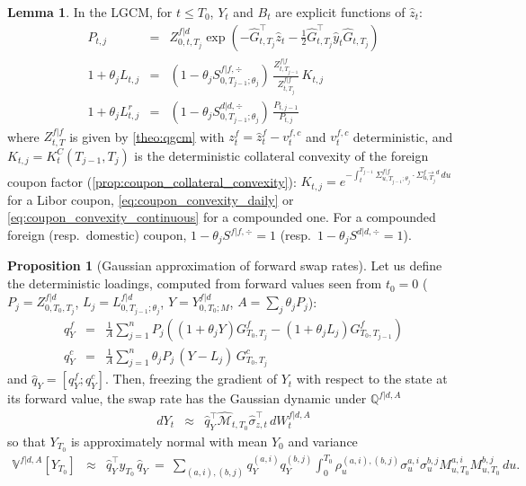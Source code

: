 \documentclass[11pt,english]{amsart}
\newcommand{\QQ}{\mathbb{Q}}
\newcommand{\VV}{\mathbb{V}}
\theoremstyle{definition}
\newtheorem{prop}{Proposition}
\newtheorem{lemm}{Lemma}
\begin{document}
\begin{lemm}\label{lemm:par_spread_state_functions}
In the LGCM, for $t\le T_0$, $Y_t$ and $B_t$ are explicit functions of $\hat{z}_t$:
\begin{eqnarray*}
  P_{t,j} &=& Z^{f|d}_{0,t,T_j} \exp\left( -\hat{G}^{\top}_{t,T_j} \hat{z}_t - \frac{1}{2} \hat{G}^{\top}_{t,T_j}  \hat{y}_t \hat{G}_{t,T_j} \right) \\
  1+\theta_j L_{t,j} &=& (1-\theta_j S^{f|f,\div}_{0,T_{j-1};\theta_j}) \, \frac{Z^{f|f}_{t,T_{j-1}}}{Z^{f|f}_{t,T_j}} \, K_{t,j}  \\
  1+\theta_j L^{r}_{t,j} &=& (1-\theta_j S^{d|d,\div}_{0,T_{j-1};\theta_j}) \, \frac{P_{t,j-1}}{P_{t,j}}
\end{eqnarray*}
where $Z^{f|f}_{t,T}$ is given by \autoref{theo:qgcm} with $z^f_t = \hat{z}^f_t - v^{f,c}_t$ and $v^{f,c}_t$ deterministic, and $K_{t,j} = K^C_t(T_{j-1},T_j)$ is the deterministic collateral convexity of the foreign coupon factor (\autoref{prop:coupon_collateral_convexity}): $K_{t,j} = e^{- \int_t^{T_{j-1}} \Sigma^{f|f}_{u,T_{j-1};\theta_j}\cdot\Sigma^{f\to d}_{u,T_j}\, du}$ for a Libor coupon, \eqref{eq:coupon_convexity_daily} or \eqref{eq:coupon_convexity_continuous} for a compounded one. For a compounded foreign (resp.\ domestic) coupon, $1-\theta_jS^{f|f,\div} = 1$ (resp.\ $1-\theta_jS^{d|d,\div} = 1$).
\end{lemm}

\begin{prop}[Gaussian approximation of forward swap rates]\label{prop:gauss_swap_rate}
Let us define the deterministic loadings, computed from forward values seen from $t_0 = 0$ ($P_j = Z^{f|d}_{0,T_0,T_j}$, $L_j = L^{f|d}_{0,T_{j-1};\theta_j}$, $Y = Y^{f|d}_{0,T_0;M}$, $A = \sum_j\theta_jP_j$):
\begin{eqnarray}
  q^{f}_Y &=& \frac{1}{A} \sum_{j=1}^n P_j\left( (1+\theta_j Y) G^f_{T_0,T_j} - (1+\theta_j L_j) G^f_{T_0,T_{j-1}} \right) \\
  q^{c}_Y &=& \frac{1}{A} \sum_{j=1}^n \theta_j P_j\, (Y - L_j)\, G^c_{T_0,T_j}
\end{eqnarray}
and $\hat{q}_Y = [q^f_Y ; q^c_Y]$. Then, freezing the gradient of $Y_t$ with respect to the state at its forward value, the swap rate has the Gaussian dynamic under $\QQ^{f|d,A}$
\begin{eqnarray}
  dY_t &\approx& \hat{q}_Y^\top \hat{\mathcal{M}}_{t,T_0} \hat{\sigma}^\top_{z,t} \, dW^{f|d,A}_t
\end{eqnarray}
so that $Y_{T_0}$ is approximately normal with mean $Y_0$ and variance
\begin{eqnarray}
  \VV^{f|d,A}\left[Y_{T_0}\right] &\approx& \hat{q}_Y^\top \hat{y}_{T_0}\, \hat{q}_Y
  ~=~ \sum_{(a,i),(b,j)} q^{(a,i)}_Y q^{(b,j)}_Y \int_0^{T_0} \rho^{(a,i),(b,j)}_u \sigma^{a,i}_u\sigma^{b,j}_u M^{a,i}_{u,T_0}M^{b,j}_{u,T_0}\, du .
  \label{eq:gauss_swap_rate_variance}
\end{eqnarray}
\end{prop}
\end{document}
